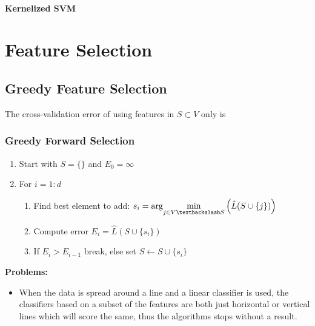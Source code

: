 \documentclass[8pt,a4paper]{scrartcl}
\newcommand{\Argmin}[2]{\text{arg}\underset{#1}{\min}\left(#2\right)}
\begin{document}
\begin{multicols*}{3}
\paragraph{Kernelized SVM}




\section{Feature Selection}

\subsection{Greedy Feature Selection}


The cross-validation error of using features in $S\subset V$ only is


\subsubsection{Greedy Forward Selection}

\begin{enumerate}
\ncompaq
\item Start with $S=\{\}$ and $E_0=\infty$
\item For $i=1:d$
\begin{enumerate}
\ncompaq
\item Find best element to add: $s_i=\Argmin{j\in V\textbackslash S}{\hat{L}(S\cup\{j\})}$
\item Compute error $E_i=\hat{L}(S\cup\{s_i\})$
\item If $E_i>E_{i-1}$ break, else set $S\leftarrow S\cup\{s_i\}$
\end{enumerate}
\end{enumerate}

\textbf{Problems:}

\begin{itemize}
\ncompaq
\item When the data is spread around a line and a linear classifier is used, the classifiers based on a subset of the features are both just horizontal or vertical lines which will score the same, thus the algorithms stops without a result.
\end{itemize}


\end{multicols*}
\end{document}
